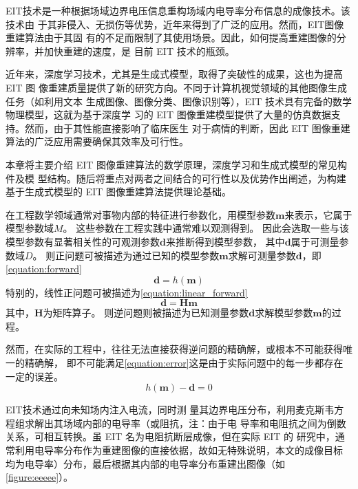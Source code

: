 

EIT技术是一种根据场域边界电压信息重构场域内电导率分布信息的成像技术。该技术由
于其非侵入、无损伤等优势，近年来得到了广泛的应用。然而，EIT图像重建算法由于其固
有的不足而限制了其使用场景。因此，如何提高重建图像的分辨率，并加快重建的速度，是
目前 EIT 技术的瓶颈。

近年来，深度学习技术，尤其是生成式模型，取得了突破性的成果，这也为提高 EIT 图
像重建质量提供了新的研究方向。不同于计算机视觉领域的其他图像生成任务（如利用文本
生成图像、图像分类、图像识别等），EIT 技术具有完备的数学物理模型，这就为基于深度学
习的 EIT 图像重建模型提供了大量的仿真数据支持。然而，由于其性能直接影响了临床医生
对于病情的判断，因此 EIT 图像重建算法的广泛应用需要确保其效率及可行性。

本章将主要介绍 EIT 图像重建算法的数学原理，深度学习和生成式模型的常见构件及模
型结构。随后将重点对两者之间结合的可行性以及优势作出阐述，为构建基于生成式模型的
EIT 图像重建算法提供理论基础。

\label{PrincipleEIT}
在工程数学领域通常对事物内部的特征进行参数化，用模型参数$\boldsymbol{m}$来表示，它属于模型参数域$M$。
这些参数在工程实践中通常难以观测得到。
因此会选取一些与该模型参数有显著相关性的可观测参数$\boldsymbol{d}$来推断得到模型参数，
其中$\boldsymbol{d}$属于可测量参数域$D$。
则正问题可被描述为通过已知的模型参数$\boldsymbol{m}$求解可测量参数$\boldsymbol{d}$，即\cref{equation:forward}
\begin{equation}
  \label{equation:forward}
  \boldsymbol{d} = h(\boldsymbol{m})
\end{equation}
特别的，线性正问题可被描述为\cref{equation:linear_forward}
\begin{equation}
  \label{equation:linear_forward}
  \boldsymbol{d} = \boldsymbol{H}\boldsymbol{m}
\end{equation}
其中，$\boldsymbol{H}$为矩阵算子。
则逆问题则被描述为已知测量参数$\boldsymbol{d}$求解模型参数$\boldsymbol{m}$的过程。

然而，在实际的工程中，往往无法直接获得逆问题的精确解，或根本不可能获得唯一的精确解，
即不可能满足\cref{equation:error}这是由于实际问题中的每一步都存在一定的误差。
\begin{equation}
  \label{equation:error}
  h(\boldsymbol{m}) - \boldsymbol{d} = 0
\end{equation}

EIT技术通过向未知场内注入电流，同时测
量其边界电压分布，利用麦克斯韦方程组求解出其场域内部的电导率（或阻抗，注：由于电
导率和电阻抗之间为倒数关系，可相互转换。虽 EIT 名为电阻抗断层成像，但在实际 EIT 的
研究中，通常利用电导率分布作为重建图像的直接依据，故如无特殊说明，本文的成像目标
均为电导率）分布，最后根据其内部的电导率分布重建出图像（如\cref{figure:eeeee}）。

